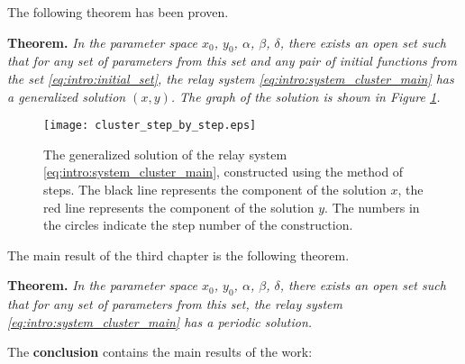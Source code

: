The following theorem has been proven.

\bigskip

\textbf{Theorem.}
\textit{In the parameter space \(x_0\), \(y_0\), \(\alpha\), \(\beta\), \(\delta\), there exists an open set such that for any set of parameters from this set and any pair of initial functions from the set \eqref{eq:intro:initial_set}, the relay system \eqref{eq:intro:system_cluster_main} has a generalized solution \((x, y)\). The graph of the solution is shown in Figure \ref{fig:intro:cluster_step_by_step}.}


\begin{figure}[!ht]
	\centering
	\texttt{[image: cluster\_step\_by\_step.eps]}
	\caption{The generalized solution of the relay system \eqref{eq:intro:system_cluster_main}, constructed using the method of steps. The black line represents the component of the solution $x$, the red line represents the component of the solution $y$. The numbers in the circles indicate the step number of the construction.}
	\label{fig:intro:cluster_step_by_step}
\end{figure}

The main result of the third chapter is the following theorem.

\textbf{Theorem.} \textit{In the parameter space \(x_0\), \(y_0\), \(\alpha\), \(\beta\), \(\delta\), there exists an open set such that for any set of parameters from this set, the relay system \eqref{eq:intro:system_cluster_main} has a periodic solution.}

\FloatBarrier
{}                                  %

The \textbf{conclusion} contains the main results of the work:



\renewcommand*{\insertbiblioauthor}{
	\printbibliography[heading=pubgroup, section=0, filter=papersregistered, title=\bibtitleauthorEng]
}

\renewcommand*{\insertbiblioexternal}{
	\printbibliography[heading=pubgroup, section=0, keyword=biblioexternal, title=\bibtitlefullEng]
}

